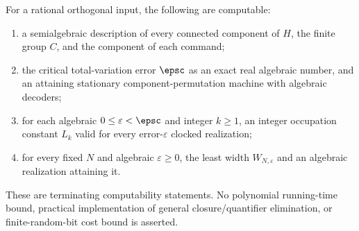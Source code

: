\begin{theorem}\label{thm:effective54}
For a rational orthogonal input, the following are computable:
\begin{enumerate}
\item a semialgebraic description of every connected component of $H$, the finite group $C$, and the component of each command;
\item the critical total-variation error $\epsc$ as an exact real algebraic number, and an attaining stationary component-permutation machine with algebraic decoders;
\item for each algebraic $0\le\varepsilon<\epsc$ and integer $k\ge1$, an integer occupation constant $L_k$ valid for every error-$\varepsilon$ clocked realization;
\item for every fixed $N$ and algebraic $\varepsilon\ge0$, the least width $W_{N,\varepsilon}$ and an algebraic realization attaining it.
\end{enumerate}
These are terminating computability statements. No polynomial running-time bound, practical implementation of general closure/quantifier elimination, or finite-random-bit cost bound is asserted.
\end{theorem}
